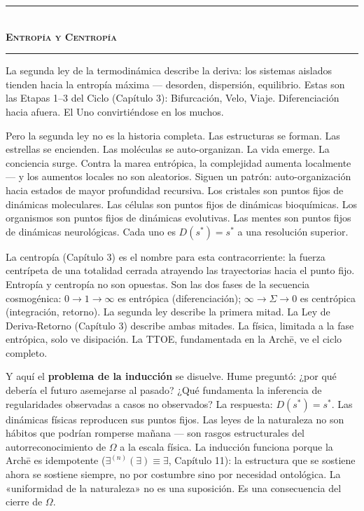 \documentclass[10pt, openany, oneside]{book}
\renewcommand{\normalsize}{\fontsize{10}{13}\selectfont}
\begin{document}
\vspace{1.5em}


\begin{center}
    \rule{0.3\textwidth}{0.4pt}\\[0.5em]
    {\normalsize\bfseries\scshape Entropía y Centropía}\\[0.3em]
    \rule{0.3\textwidth}{0.4pt}
\end{center}

\vspace{1em}

\noindent La segunda ley de la termodinámica describe la deriva: los sistemas aislados tienden hacia la entropía máxima --- desorden, dispersión, equilibrio. Estas son las Etapas 1--3 del Ciclo (Capítulo 3): Bifurcación, Velo, Viaje. Diferenciación hacia afuera. El Uno convirtiéndose en los muchos.

Pero la segunda ley no es la historia completa. Las estructuras se forman. Las estrellas se encienden. Las moléculas se auto-organizan. La vida emerge. La conciencia surge. Contra la marea entrópica, la complejidad aumenta localmente --- y los aumentos locales no son aleatorios. Siguen un patrón: auto-organización hacia estados de mayor profundidad recursiva. Los cristales son puntos fijos de dinámicas moleculares. Las células son puntos fijos de dinámicas bioquímicas. Los organismos son puntos fijos de dinámicas evolutivas. Las mentes son puntos fijos de dinámicas neurológicas. Cada uno es $D(s^*) = s^*$ a una resolución superior.

La centropía (Capítulo 3) es el nombre para esta contracorriente: la fuerza centrípeta de una totalidad cerrada atrayendo las trayectorias hacia el punto fijo. Entropía y centropía no son opuestas. Son las dos fases de la secuencia cosmogénica: $0 \to 1 \to \infty$ es entrópica (diferenciación); $\infty \to \Sigma \to 0$ es centrópica (integración, retorno). La segunda ley describe la primera mitad. La Ley de Deriva-Retorno (Capítulo 3) describe ambas mitades. La física, limitada a la fase entrópica, solo ve disipación. La TTOE, fundamentada en la Arch\={e}, ve el ciclo completo.

Y aquí el \textbf{problema de la inducción} se disuelve. Hume preguntó: ¿por qué debería el futuro asemejarse al pasado? ¿Qué fundamenta la inferencia de regularidades observadas a casos no observados? La respuesta: $D(s^*) = s^*$. Las dinámicas físicas reproducen sus puntos fijos. Las leyes de la naturaleza no son hábitos que podrían romperse mañana --- son rasgos estructurales del autorreconocimiento de $\Omega$ a la escala física. La inducción funciona porque la Arch\={e} es idempotente ($\exists^{(n)}(\exists) \equiv \exists$, Capítulo 11): la estructura que se sostiene ahora se sostiene siempre, no por costumbre sino por necesidad ontológica. La «uniformidad de la naturaleza» no es una suposición. Es una consecuencia del cierre de $\Omega$.
\end{document}
